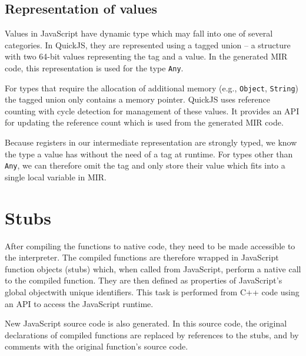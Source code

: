\subsection{Representation of values}

Values in JavaScript have dynamic type which may fall into one of several categories. In QuickJS, they are represented using a tagged union -- a structure with two 64-bit values representing the tag and a value. In the generated MIR code, this representation is used for the type \texttt{Any}.

For types that require the allocation of additional memory (e.g., \texttt{Object}, \texttt{String}) the tagged union only contains a memory pointer. QuickJS uses reference counting with cycle detection for management of these values. It provides an API for updating the reference count which is used from the generated MIR code.

Because registers in our intermediate representation are strongly typed, we know the type a value has without the need of a tag at runtime. For types other than \texttt{Any}, we can therefore omit the tag and only store their value which fits into a single local variable in MIR.


\section{Stubs}\label{impl:stubs}

After compiling the functions to native code, they need to be made accessible to the interpreter. The compiled functions are therefore wrapped in JavaScript function objects (stubs) which, when called from JavaScript, perform a native call to the compiled function. They are then defined as properties of JavaScript's global object\footnotemark[1] with unique identifiers. This task is performed from C++ code using an API to access the JavaScript runtime.


New JavaScript source code is also generated. In this source code, the original declarations of compiled functions are replaced by references to the stubs, and by comments with the original function's source code.


